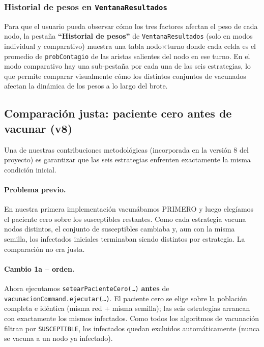 \documentclass[spanish,notitlepage,letterpaper, 12pt]{article}
\begin{document}
\subsubsection{Historial de pesos en \texttt{VentanaResultados}}

Para que el usuario pueda observar c\'omo los tres factores afectan el peso de cada nodo, la pestaña \textbf{``Historial de pesos''} de \texttt{VentanaResultados} (solo en modos individual y comparativo) muestra una tabla nodo$\times$turno donde cada celda es el promedio de \texttt{probContagio} de las aristas salientes del nodo en ese turno. En el modo comparativo hay una sub-pesta\~na por cada una de las seis estrategias, lo que permite comparar visualmente c\'omo los distintos conjuntos de vacunados afectan la din\'amica de los pesos a lo largo del brote.



\subsection{Comparaci\'on justa: paciente cero antes de vacunar (v8)}
\label{sec:comparacion_justa}

Una de nuestras contribuciones metodol\'ogicas (incorporada en la versi\'on 8 del proyecto) es garantizar que las seis estrategias enfrenten exactamente la misma condici\'on inicial.

\paragraph{Problema previo.} En nuestra primera implementaci\'on vacun\'abamos PRIMERO y luego eleg\'iamos el paciente cero sobre los susceptibles restantes. Como cada estrategia vacuna nodos distintos, el conjunto de susceptibles cambiaba y, aun con la misma semilla, los infectados iniciales terminaban siendo distintos por estrategia. La comparaci\'on no era justa.

\paragraph{Cambio 1a -- orden.} Ahora ejecutamos \texttt{setearPacienteCero(\ldots)} \textbf{antes} de \texttt{vacunacionCommand.ejecutar(\ldots)}. El paciente cero se elige sobre la poblaci\'on completa e id\'entica (misma red + misma semilla); las seis estrategias arrancan con exactamente los mismos infectados. Como todos los algoritmos de vacunaci\'on filtran por \texttt{SUSCEPTIBLE}, los infectados quedan excluidos autom\'aticamente (nunca se vacuna a un nodo ya infectado).
\end{document}
